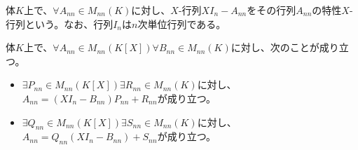 \documentclass[dvipdfmx]{jsarticle}
\begin{document}
\begin{dfn}
体$K$上で、$\forall A_{nn} \in M_{nn}(K)$に対し、$X$-行列$XI_{n} - A_{nn}$をその行列$A_{nn}$の特性$X$-行列という。なお、行列$I_{n}$は$n$次単位行列である。
\end{dfn}
\begin{thm}\label{2.2.8.10}
体$K$上で、$\forall A_{nn} \in M_{nn}\left( K[ X] \right)\forall B_{nn} \in M_{nn}(K)$に対し、次のことが成り立つ。
\begin{itemize}
\item
  $\exists P_{nn} \in M_{nn}\left( K[ X] \right)\exists R_{nn} \in M_{nn}(K)$に対し、$A_{nn} = \left( XI_{n} - B_{nn} \right)P_{nn} + R_{nn}$が成り立つ。
\item
  $\exists Q_{nn} \in M_{nn}\left( K[ X] \right)\exists S_{nn} \in M_{nn}(K)$に対し、$A_{nn} = Q_{nn}\left( XI_{n} - B_{nn} \right) + S_{nn}$が成り立つ。
\end{itemize}
\end{thm}
\end{document}
